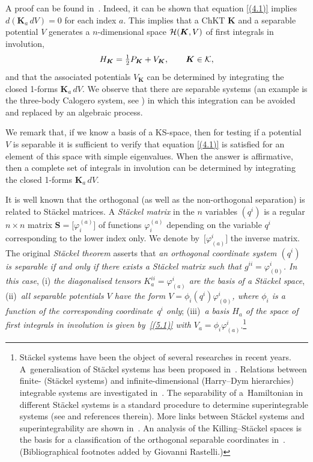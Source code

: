\documentclass[pdftex]{sigma}
\def\bs{\boldsymbol}
\numberwithin{equation}{section}
\begin{document}
A proof can be found in~\cite{Benenti-1993}. Indeed, it can be shown that equation \eqref{(4.1)} implies $d(\bs K_a\,dV)=0$ for each index $a$. This implies that a ChKT $\bs K$ and a separable potential $V$ generates a $n$-dimensional space ${\cal H}(\bs K,V)$ of f\/irst integrals in involution,
\begin{gather*}
H_{\bs K}=\tfrac 12 P_{\bs K}+V_{\bs K}, \qquad \bs K\in \cal K,
\end{gather*}
and that the associated potentials $V_{\bs K}$ can be determined by integrating the closed 1-forms $\bs K_a\,dV$. We observe that there are separable systems (an example is the three-body Calogero system, see \cite{BCR-2000}) in which this integration can be avoided and replaced by an algebraic process.

We remark that, if we know a basis of a KS-space, then for testing if a potential $V$ is separable it is suf\/f\/icient to verify that equation \eqref{(4.1)} is satisf\/ied for an element of this space with simple eigenvalues. When the answer is af\/f\/irmative, then a complete set of integrals in involution can be determined by integrating the closed 1-forms $\bs K_a\,dV$.

It is well known that the orthogonal (as well as the non-orthogonal separation) is related to St\"ackel matrices. A {\it St\"ackel matrix} in the $n$ variables $(q^i)$ is a regular $n\times n$ matrix $\bs S=\big[\varphi_i^{(a)}\big]$ of functions $\varphi_i^{(a)}$ depending on the variable $q^i$ corresponding to the lower index only. We denote by~$\big[\varphi_{(a)}^i\big]$ the inverse matrix. The original {\it St\"ackel theorem}
asserts that {\it an orthogonal coordinate system $(q^i)$ is separable if and only if there exists a St\"ackel matrix such that $g^{ii}=\varphi_{(0)}^i$. In this case},  (i) {\it the diagonalised tensors $K_a^{ii}=\varphi_{(a)}^i$ are the basis of a St\"ackel space}, (ii)~{\it all separable potentials $V$ have the form $V=\phi_i(q^i) \varphi_{(0)}^i$,
where $\phi_i$ is a function of the corresponding coordinate~$q^i$ only};  (iii)~{\it a basis $H_a$  of the space of
f\/irst integrals in involution is given by~\eqref{(5.1)} with $V_a=\phi_i \varphi_{(a)}^i$}.\footnote{St\"ackel systems have been the object of several researches in recent years. A~generalisation of St\"ackel systems has been proposed in~\cite{Blaszak-Sergyeyev-2011}. Relations between f\/inite- (St\"ackel systems) and inf\/inite-dimensional (Harry--Dym hierarchies) integrable systems are investigated in~\cite{Marciniak-Blaszak-2010}. The separability of  a~Hamiltonian  in dif\/ferent St\"ackel systems is a standard procedure to determine  superintegrable systems (see \cite{Miller-Post-Winternitz-2013} and references therein). More links between St\"ackel systems and superintegrability are shown in~\cite{Tsiganov-2010}. An analysis of the Killing--St\"ackel spaces is the basis for a classif\/ication of the orthogonal separable coordinates  in~\cite{Rajaratnam-McLenaghan-2014}. (Bibliographical footnotes added by Giovanni Rastelli.)\label{pagenote1}}
\end{document}
